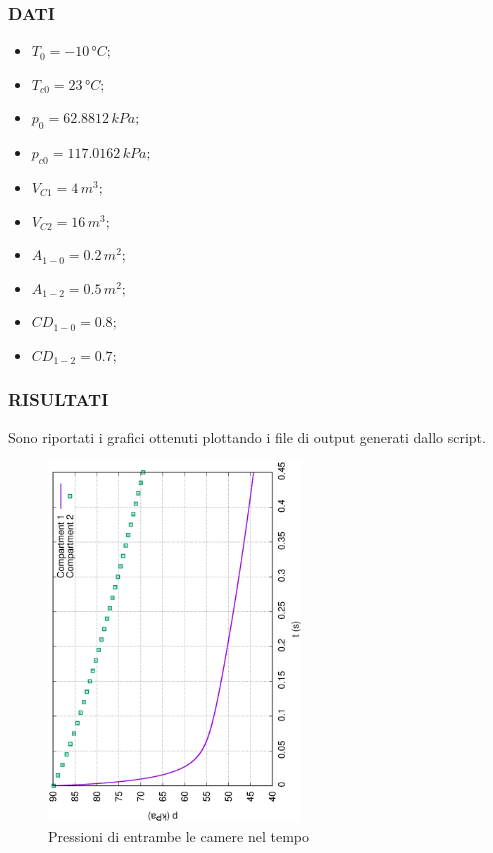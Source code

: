 \documentclass{article}
\begin{document}
        \subsubsection{DATI}
        \begin{itemize}
            \item $\displaystyle T_0 = -10\,°C;$ \
            \item $\displaystyle T_{c0} = 23\,°C;$ \
            \item $\displaystyle p_0 = 62.8812\,kPa;$ \
            \item $\displaystyle p_{c0} = 117.0162\,kPa;$ \
            \item $\displaystyle V_{C1} = 4\,m^3;$ \
            \item $\displaystyle V_{C2} = 16\,m^3;$ \
            \item $\displaystyle A_{1-0} = 0.2\,m^2;$ \
            \item $\displaystyle A_{1-2} = 0.5\,m^2;$ \
            \item $\displaystyle CD_{1-0} = 0.8;$ \
            \item $\displaystyle CD_{1-2} = 0.7;$ \
        \end{itemize}
        \clearpage

        \subsubsection{RISULTATI}
        
        Sono riportati i grafici ottenuti plottando i file di output
        generati dallo script.
        \begin{figure}[h!]
            \centering
            \phantomsection
            \label{fig:press_cam_ex}
            \includegraphics[width=0.6\textwidth, angle=-90]{MUL2/Esercitazione1/1A/p.eps}
            \caption{Pressioni di entrambe le camere nel tempo}
        \end{figure}
\end{document}
